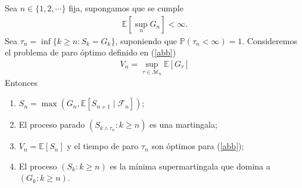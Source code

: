 \begin{theorem}
\label{probmartin}
Sea $n \in \{1, 2, \cdots\}$ fija, supongamos que se cumple
	\begin{align*}
	\mathbb{E} \left[ \sup_n G_n \right] < \infty.
	\end{align*}
Sea $\tau_n = \inf \{k \geq n : S_k = G_k\}$, suponiendo que $\mathbb{P}(\tau_n < \infty) = 1$. Consideremos el problema de paro óptimo definido en (\ref{abb})
	\begin{align*}
	V_n = \sup_{\tau \in \mathcal{M}_n} \mathbb{E}[G_\tau]
	\end{align*}
Entonces
\begin{enumerate}
\item $S_n = \max (G_n, \mathbb{E}[S_{n+1} \mid \mathcal{F}_n])$;
\item El proceso parado $(S_{k \wedge \tau_n} : k \geq n)$ es una martingala;
\item $V_n = \mathbb{E}[S_n]$ y el tiempo de paro $\tau_n$ son óptimos para (\ref{abb});
\item El proceso $(S_k : k \geq n)$ es la mínima supermartingala que domina a $(G_k : k \geq n)$.
\end{enumerate}
\end{theorem}

